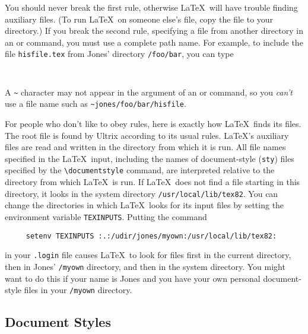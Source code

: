 You should never break the first rule, otherwise \LaTeX\ will have
trouble finding auxiliary files.  (To run \LaTeX\ on someone else's
file, copy the file to your directory.) If you break the second
rule, specifying a file from another directory in an
\hbox{\verb||} or \hbox{\verb||} command, you must use a
complete path name.  For example, to include the file \mbox{\tt hisfile.tex} 
from Jones' directory \hbox{\verb|/foo/bar|}, you can type
\begin{verbatim}
     
\end{verbatim}
A \verb|~| character may not appear in the argument of an
\hbox{\verb||} or \hbox{\verb||} command, so you {\em
can't\/} use a file name such as \hbox{\verb|~jones/foo/bar/hisfile|}.
 
For people who don't like to obey rules, 
here is exactly how \LaTeX\ finds its
files.  The root file is found by Ultrix according to its usual rules.
\LaTeX's auxiliary files are read and written in the directory from
which it is run.  All file names specified in the \LaTeX\ input,
including the names of document-style ({\tt sty}) files specified by
the \hbox{\verb|\documentstyle|} command, are interpreted relative to
the directory from which \LaTeX\ is run.  If \LaTeX\ does not find a
file starting in this directory, it looks in the system directory
\hbox{\verb|/usr/local/lib/tex82|}.  You can change the directories in
which \LaTeX\ looks for its input files by setting the environment
variable \mbox{\tt TEXINPUTS}.  Putting the command
\begin{verbatim}
     setenv TEXINPUTS :.:/udir/jones/myown:/usr/local/lib/tex82:
\end{verbatim}
in your \mbox{\tt .login} file causes \LaTeX\ to look for files first
in the current directory, then in Jones' {\tt /myown} directory, and
then in the system directory.  You might want to do this if your name
is Jones and you have your own personal document-style files in your
{\tt /myown} directory. 
 
\subsection{Document Styles}
 
